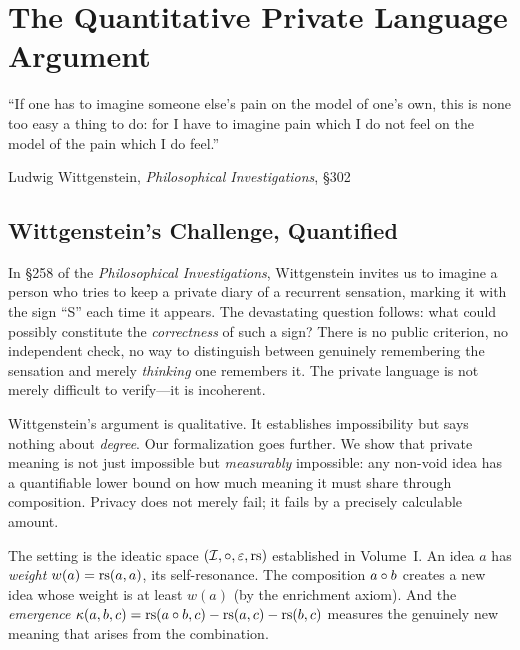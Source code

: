 

\chapter{The Quantitative Private Language Argument}
\label{ch:private-language}

\epigraph{``If one has to imagine someone else's pain on the model of
one's own, this is none too easy a thing to do: for I have to imagine
pain which I do not feel on the model of the pain which I do feel.''}
{Ludwig Wittgenstein, \textit{Philosophical Investigations}, \S302}

\section{Wittgenstein's Challenge, Quantified}

In \S258 of the \textit{Philosophical Investigations}, Wittgenstein invites us
to imagine a person who tries to keep a private diary of a recurrent
sensation, marking it with the sign ``S'' each time it appears. The
devastating question follows: what could possibly constitute the
\emph{correctness} of such a sign? There is no public criterion, no
independent check, no way to distinguish between genuinely remembering
the sensation and merely \emph{thinking} one remembers it. The private
language is not merely difficult to verify---it is incoherent.

Wittgenstein's argument is qualitative. It establishes impossibility but
says nothing about \emph{degree}. Our formalization goes further. We show
that private meaning is not just impossible but \emph{measurably}
impossible: any non-void idea has a quantifiable lower bound on how much
meaning it must share through composition. Privacy does not merely fail;
it fails by a precisely calculable amount.

The setting is the ideatic space $(\mathcal{I}, \circ, \varepsilon, \mathrm{rs})$
established in Volume~I. An idea $a$ has \emph{weight}
$w(a) = \mathrm{rs}(a, a)$, its self-resonance. The composition $a \circ b$
creates a new idea whose weight is at least $w(a)$ (by the enrichment
axiom). And the \emph{emergence}
$\kappa(a, b, c) = \mathrm{rs}(a \circ b, c) - \mathrm{rs}(a, c) - \mathrm{rs}(b, c)$
measures the genuinely new meaning that arises from the combination.

